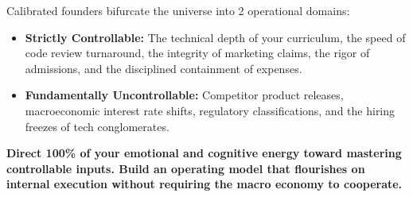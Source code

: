 Calibrated founders bifurcate the universe into 2 operational domains:

\begin{itemize}[leftmargin=10pt,itemsep=1pt,topsep=1pt]
  \item \textbf{Strictly Controllable:} The technical depth of your curriculum, the speed of code review turnaround, the integrity of marketing claims, the rigor of admissions, and the disciplined containment of expenses.
  \item \textbf{Fundamentally Uncontrollable:} Competitor product releases, macroeconomic interest rate shifts, regulatory classifications, and the hiring freezes of tech conglomerates.
\end{itemize}

\textbf{Direct 100\% of your emotional and cognitive energy toward mastering controllable inputs. Build an operating model that flourishes on internal execution without requiring the macro economy to cooperate.}
